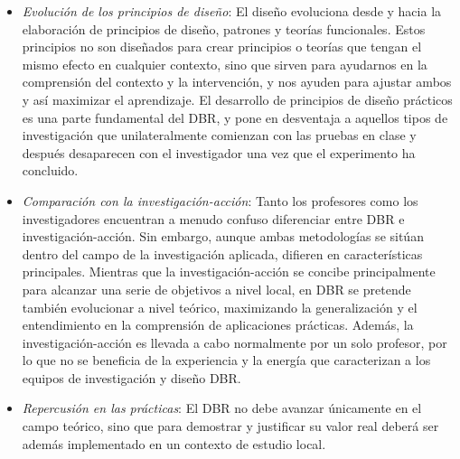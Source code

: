 \begin{itemize}
\item \emph{Evolución de los principios de diseño}: El diseño evoluciona desde y hacia la elaboración de principios de diseño, patrones y teorías funcionales. Estos principios no son diseñados para crear principios o teorías que tengan el mismo efecto en cualquier contexto, sino que sirven para ayudarnos en la comprensión del contexto y la intervención, y nos ayuden para ajustar ambos y así maximizar el aprendizaje.  El desarrollo de principios de diseño prácticos es una parte fundamental del DBR, y pone en desventaja a aquellos tipos de investigación que unilateralmente comienzan con las pruebas en clase y después desaparecen con el investigador una vez que el experimento ha concluido.
\item \emph{Comparación con la investigación-acción}: Tanto los profesores como los investigadores encuentran a menudo confuso diferenciar entre DBR e investigación-acción. Sin embargo, aunque ambas metodologías se sitúan dentro del campo de la investigación aplicada, difieren en características principales. Mientras que la investigación-acción se concibe principalmente para alcanzar una serie de objetivos a nivel local, en DBR se pretende también evolucionar a nivel teórico, maximizando la generalización y el entendimiento en la comprensión de aplicaciones prácticas. Además, la investigación-acción es llevada a cabo normalmente por un solo profesor, por lo que no se beneficia de la experiencia y la energía que caracterizan a los equipos de investigación y diseño DBR.
\item \emph{Repercusión en las prácticas}: El DBR no debe avanzar únicamente en el campo teórico, sino que para demostrar y justificar su valor real deberá ser además implementado en un contexto de estudio local.
\end{itemize}